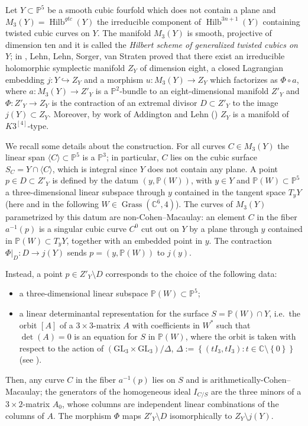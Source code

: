 \documentclass{amsart}
\theoremstyle{definition}
\newcommand{\ra}{\rightarrow}
\newcommand{\coloneqq}{:=}
\newcommand{\hskq}{K3^{\left[4\right]}}
\DeclareMathOperator{\hilb}{Hilb}
\DeclareMathOperator{\grass}{Grass}
\begin{document}
Let $Y \subset \mathbb{P}^5$ be a smooth cubic fourfold which does not contain a plane and $M_3(Y) = \hilb^{\textit{gtc}}(Y)$ the irreducible component of $\hilb^{3n+1}(Y)$ containing twisted cubic curves on $Y$. The manifold $M_3(Y)$ is smooth, projective of dimension ten and it is called the \emph{Hilbert scheme of generalized twisted cubics on $Y$}; in \cite{llsvs}, Lehn, Lehn, Sorger, van Straten proved that there exist an irreducible holomorphic symplectic manifold $Z_Y$ of dimension eight, a closed Lagrangian embedding $j: Y \hookrightarrow Z_Y$ and a morphism $u: M_3(Y) \ra Z_Y$ which factorizes as $\Phi \circ a$, where $a: M_3(Y) \ra Z'_Y$ is a $\mathbb{P}^2$-bundle to an eight-dimensional manifold $Z'_Y$ and $\Phi: Z'_Y \ra Z_Y$ is the contraction of an extremal divisor $D \subset Z'_Y$ to the image $j(Y) \subset Z_Y$. Moreover, by work of Addington and Lehn (\cite{add_lehn}) $Z_Y$ is a manifold of $\hskq$-type.

We recall some details about the construction. For all curves $C \in M_3(Y)$ the linear span $\langle C \rangle \subset \mathbb{P}^5$ is a $\mathbb{P}^3$; in particular, $C$ lies on the cubic surface $S_C = Y \cap \langle C \rangle$, which is integral since $Y$ does not contain any plane. A point $p \in D \subset Z'_Y$ is defined by the datum $(y, \mathbb{P}(W))$, with $y \in Y$ and $\mathbb{P}(W) \subset \mathbb{P}^5$ a three-dimensional linear subspace through $y$ contained in the tangent space $T_y Y$ (here and in the following $W \in \grass(\mathbb{C}^6,4)$). The curves of $M_3(Y)$ parametrized by this datum are non-Cohen--Macaulay: an element $C$ in the fiber $a^{-1}(p)$ is a singular cubic curve $C^0$ cut out on $Y$ by a plane through $y$ contained in $\mathbb{P}(W) \subset T_y Y$, together with an embedded point in $y$. The contraction $\Phi\vert_D: D \ra j(Y)$ sends $p=(y, \mathbb{P}(W))$ to $j(y)$.

Instead, a point $p \in Z'_Y \setminus D$ corresponds to the choice of the following data:
\begin{itemize}
\item a three-dimensional linear subspace $\mathbb{P}(W) \subset \mathbb{P}^5$;
\item a linear determinantal representation for the surface $S = \mathbb{P}(W) \cap Y$, i.e.\ the orbit $[A]$ of a $3\times 3$-matrix $A$ with coefficients in $W^*$ such that $\det(A) = 0$ is an equation for $S$ in $\mathbb{P}(W)$, where the orbit is taken with respect to the action of $\left( \textrm{GL}_3 \times \textrm{GL}_3\right)/\Delta$, $\Delta \coloneqq \left\{ (tI_3, tI_3) : t \in \mathbb{C}\setminus \left\{ 0 \right\} \right\}$ (see \cite[\S 3]{llsvs}).
\end{itemize}
Then, any curve $C$ in the fiber $a^{-1}(p)$ lies on $S$ and is arithmetically-Cohen--Macaulay; the generators of the homogeneous ideal $I_{C/S}$ are the three minors of a $3 \times 2$-matrix $A_0$, whose columns are independent linear combinations of the columns of $A$. The morphism $\Phi$ maps $Z'_Y \setminus D$ isomorphically to $Z_Y \setminus j(Y)$.
 
\end{document}
